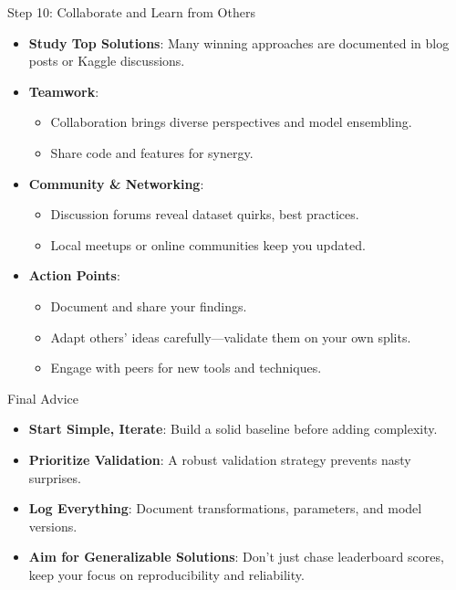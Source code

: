 \documentclass[10pt,compress,t,notes=noshow, xcolor=table]{beamer}
\begin{document}
\begin{frame}{Step 10: Collaborate and Learn from Others}
\begin{itemize}
  \item \textbf{Study Top Solutions}: Many winning approaches are documented in blog posts or Kaggle discussions.
  \item \textbf{Teamwork}:
    \begin{itemize}
      \item Collaboration brings diverse perspectives and model ensembling.
      \item Share code and features for synergy.
    \end{itemize}
  \item \textbf{Community \& Networking}:
    \begin{itemize}
      \item Discussion forums reveal dataset quirks, best practices.
      \item Local meetups or online communities keep you updated.
    \end{itemize}
  \item \textbf{Action Points}:
    \begin{itemize}
      \item Document and share your findings.
      \item Adapt others' ideas carefully—validate them on your own splits.
      \item Engage with peers for new tools and techniques.
    \end{itemize}
\end{itemize}
\end{frame}

\begin{frame}{Final Advice}
\begin{itemize}
  \item \textbf{Start Simple, Iterate}: Build a solid baseline before adding complexity.
  \item \textbf{Prioritize Validation}: A robust validation strategy prevents nasty surprises.
  \item \textbf{Log Everything}: Document transformations, parameters, and model versions.
  \item \textbf{Aim for Generalizable Solutions}: Don't just chase leaderboard scores, keep your focus on reproducibility and reliability.
\end{itemize}
\end{frame}


\endlecture
\end{document}
